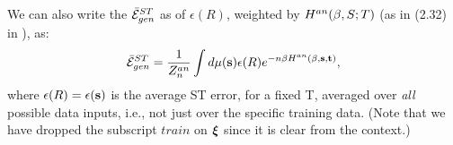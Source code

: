 We can also write the \ModelGeneralizationError $\bar{\mathcal{E}}^{ST}_{gen}$  as \BoltzmannWeightedAverage
of $\epsilon(R)$, weighted by $H^{an}(\beta,S;T)$ (as in (2.32) in \cite{SST92}), as:
\begin{align}
\label{eqn:EgCanonical}
\bar{\mathcal{E}}^{ST}_{gen}=\dfrac{1}{Z^{an}_{n}}\int d\mu({\mathbf{s}})\epsilon(R)e^{-n\beta H^{an}(\beta,{\mathbf{s}},{\mathbf{t}})} ,
\end{align}
where $\epsilon(R)=\epsilon({\mathbf{s}})$ is the average ST error, for a fixed \Teacher T,
averaged over \emph{all} possible data inputs, i.e., not just over the specific training data.
(Note that we have dropped the subscript $train$ on $\boldsymbol{\xi}$ since it is clear from the context.)






